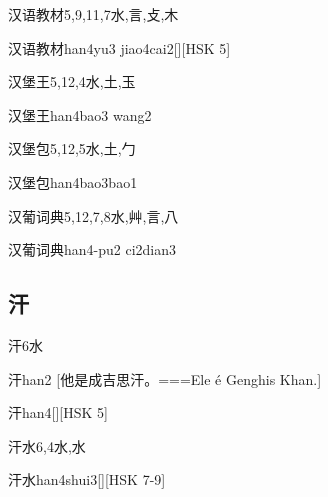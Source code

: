 \begin{Entry}{汉语教材}{5,9,11,7}{⽔,⾔,⽁,⽊}
  \begin{Phonetics}{汉语教材}{han4yu3 jiao4cai2}[][HSK 5]
  \end{Phonetics}
\end{Entry}

\begin{Entry}{汉堡王}{5,12,4}{⽔,⼟,⽟}
  \begin{Phonetics}{汉堡王}{han4bao3 wang2}
  \end{Phonetics}
\end{Entry}

\begin{Entry}{汉堡包}{5,12,5}{⽔,⼟,⼓}
  \begin{Phonetics}{汉堡包}{han4bao3bao1}
  \end{Phonetics}
\end{Entry}

\begin{Entry}{汉葡词典}{5,12,7,8}{⽔,⾋,⾔,⼋}
  \begin{Phonetics}{汉葡词典}{han4-pu2 ci2dian3}
  \end{Phonetics}
\end{Entry}

\subsection*{汗}

\begin{Entry}{汗}{6}{⽔}
  \begin{Phonetics}{汗}{han2}
    [他是成吉思汗。===Ele é Genghis Khan.]
  \end{Phonetics}
  \begin{Phonetics}{汗}{han4}[][HSK 5]
  \end{Phonetics}
\end{Entry}

\begin{Entry}{汗水}{6,4}{⽔,⽔}
  \begin{Phonetics}{汗水}{han4shui3}[][HSK 7-9]
  \end{Phonetics}
\end{Entry}

